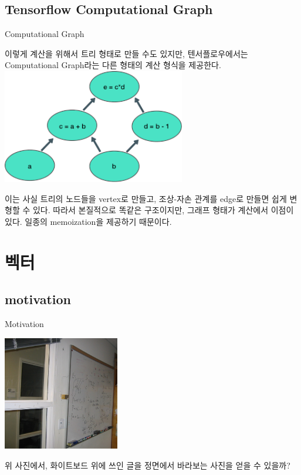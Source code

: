 \documentclass{beamer}
\begin{document}
\subsection{Tensorflow Computational Graph} 

\begin{frame}{Computational Graph} 

이렇게 계산을 위해서 트리 형태로 만들 수도 있지만, 텐서플로우에서는 Computational Graph라는 다른 형태의 계산 형식을 제공한다. 
\includegraphics[height=5cm,keepaspectratio]{compgraph}

이는 사실 트리의 노드들을 vertex로 만들고, 조상-자손 관계를 edge로 만들면 쉽게 변형할 수 있다. 따라서 본질적으로 똑같은 구조이지만, 그래프 형태가 계산에서 이점이 있다. 일종의 memoization을 제공하기 때문이다. 
\end{frame}


\section{벡터} 

\subsection{motivation}

\begin{frame}{Motivation} 

\includegraphics[height=5cm,keepaspectratio]{board}

위 사진에서, 화이트보드 위에 쓰인 글을 정면에서 바라보는 사진을 얻을 수 있을까? 

\end{frame}
\end{document}
